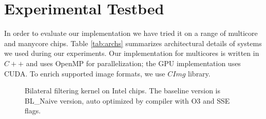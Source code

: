 \documentclass{IEEEtran}
\begin{document}
\section{Experimental Testbed}
\label{sec:expt}

In order to evaluate our implementation we have tried it on a range of multicore and manycore chips. Table \ref{tab:archs} summarizes architectural details of systems we used during our experiments. Our implementation for multicores is written in $C++$ and uses OpenMP for parallelization; the GPU implementation uses CUDA. To enrich supported image formats, we use $CImg$ library. 

\begin{figure}[t!] 
\begin{centering} 
\end{centering}
\caption{Bilateral filtering kernel on Intel chips. The baseline version is BL\_Naive version, auto optimized by compiler with O3 and SSE flags.} 
\label{fig:comparisonIntel} 
\end{figure} 
\end{document}
